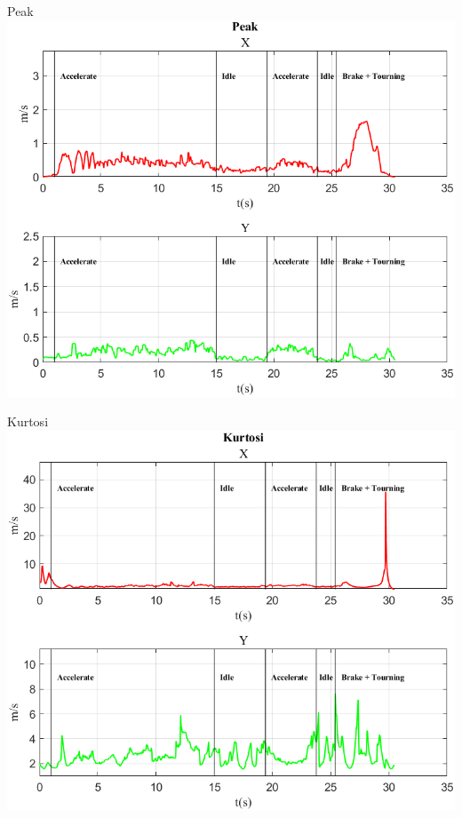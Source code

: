 \documentclass[beamer]{standalone}
\begin{document}
	\begin{frame}{{Peak}}
		\centering\includegraphics[height=.8\textheight]{figure/Vel/Peak}
	\end{frame}
	
	\begin{frame}{{Kurtosi}}
		\centering\includegraphics[height=.8\textheight]{figure/Vel/Kurtosi}
	\end{frame}
	
\end{document}

